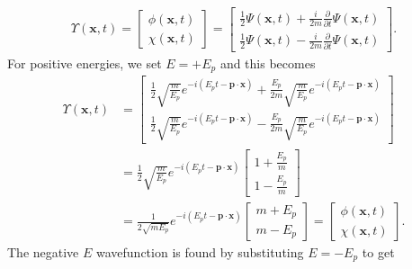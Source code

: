 \documentclass[titlepage,letterpaper,onecolumn,11pt,final]{report}
\newcommand{\psxt}{\Psi (\mathbf{x},t)}
\numberwithin{equation}{section}
\numberwithin{figure}{section}
\begin{document}
\begin{gather}
	\Upsilon (\mathbf{x}, t) = 
	\begin{bmatrix}
		\phi (\mathbf{x}, t) \\[6pt]
		\chi (\mathbf{x}, t)
	\end{bmatrix}
	= 
	\begin{bmatrix}
		\frac{1}{2} \psxt + \frac{i}{2 m} \frac{\partial}{\partial t} \psxt \\[6pt]
		\frac{1}{2} \psxt - \frac{i}{2 m} \frac{\partial}{\partial t} \psxt
	\end{bmatrix} .
\end{gather} 
%
For positive energies, we set $E = +E_{p}$ and this becomes
\begin{equation}
\begin{split}
	\label{eq:positive_E_upsilon}
	\Upsilon (\mathbf{x}, t) &= 
	\begin{bmatrix}
		\frac{1}{2} \sqrt{\frac{m}{E_{p}}} e^{-i(E_{p} t - \mathbf{p} \cdot \mathbf{x})} + \frac{E_{p}}{2 m} \sqrt{\frac{m}{E_{p}}} e^{-i(E_{p} t - \mathbf{p} \cdot \mathbf{x})} \\[6pt]
		\frac{1}{2} \sqrt{\frac{m}{E_{p}}} e^{-i(E_{p} t - \mathbf{p} \cdot \mathbf{x})} - \frac{E_{p}}{2 m} \sqrt{\frac{m}{E_{p}}} e^{-i(E_{p} t - \mathbf{p} \cdot \mathbf{x})}
	\end{bmatrix} \\
	&= \frac{1}{2} \sqrt{\frac{m}{E_{p}}} e^{-i(E_{p} t - \mathbf{p} \cdot \mathbf{x})}
	\begin{bmatrix}
		1 + \frac{E_{p}}{m} \\[6pt]
		1 - \frac{E_{p}}{m}
	\end{bmatrix} \\
	&= \frac{1}{2 \sqrt{m E_{p}}} e^{-i(E_{p} t - \mathbf{p} \cdot \mathbf{x})}
	\begin{bmatrix}
		m + E_{p} \\[6pt]
		m - E_{p}
	\end{bmatrix}  =
	\begin{bmatrix}
		\phi (\mathbf{x}, t)\\[6pt]
		\chi (\mathbf{x}, t)
	\end{bmatrix}.
\end{split}
\end{equation}
The negative $E$ wavefunction is found by substituting $E = - E_{p}$ to get
\end{document}
